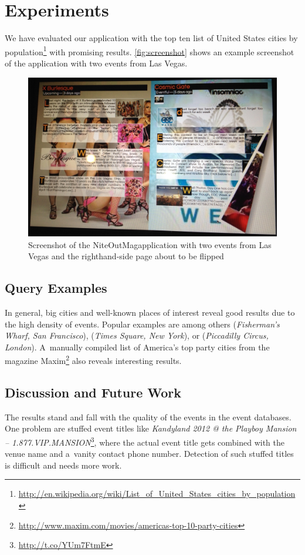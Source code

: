\documentclass{acm_proc_article-sp}
\let\oldemph\emph
\renewcommand{\emph}[1]{\oldemph{\fontsize{9}{9}\selectfont #1}}
\begin{document}
\section{Experiments}
We have evaluated our application with the top ten list of
United States cities by
population\footnote{\url{http://en.wikipedia.org/wiki/List_of_United_States_cities_by_population}}
with promising results.
\autoref{fig:screenshot} shows an example screenshot of the application
with two events from Las Vegas.

\begin{figure}[bth!]
\centering
\includegraphics[width=1.0\columnwidth]{./screenshot.jpg}
\caption{Screenshot of the NiteOutMag\texttrademark application with two events from Las Vegas and the righthand-side page about to be flipped}
\label{fig:screenshot}
\end{figure}

\subsection{Query Examples}
In general, big cities and well-known places of interest
reveal good results due to the high density of events.
Popular examples are among others
(\emph{Fisherman's Wharf, San Francisco}),
(\emph{Times Square, New York}),
or (\emph{Piccadilly Circus, London}).	
A~manually compiled list of America's top party cities
from the magazine Maxim\footnote{\url{http://www.maxim.com/movies/americas-top-10-party-cities}}
also reveals interesting results.

\subsection{Discussion and Future Work}
The results stand and fall with the quality of the events
in the event databases.
One problem are stuffed event titles like
\emph{Kandyland 2012 @ the Playboy Mansion -- 1.877.VIP.MANS\-ION}\footnote{\url{http://t.co/YUm7FtmE}},
where the actual event title gets combined with the venue name
and a~vanity contact phone number.
Detection of such stuffed titles is difficult and needs more work.
\end{document}
